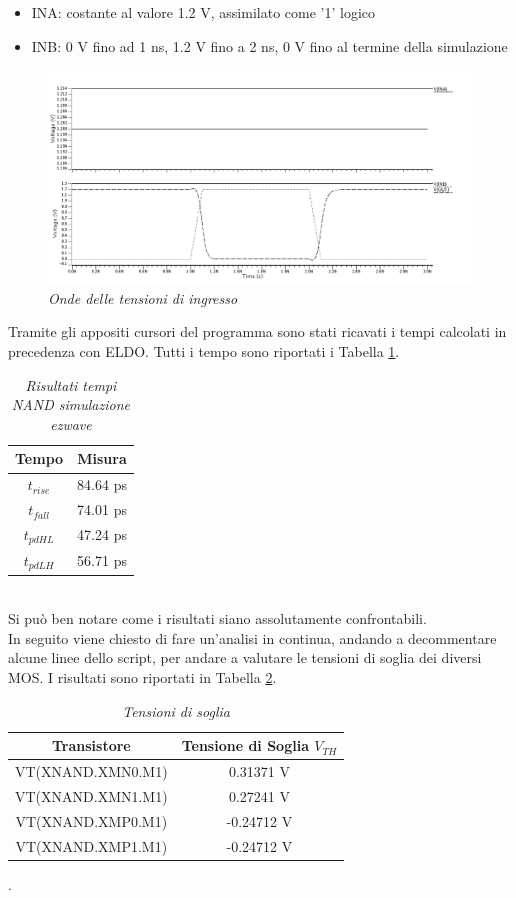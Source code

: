 \begin{itemize}
	\item INA: costante al valore 1.2 V, assimilato come '1' logico
	\item INB: 0 V fino ad 1 ns, 1.2 V fino a 2 ns, 0 V fino al termine della simulazione
\end{itemize}
\begin{figure}[!htb]
	\centering
	\includegraphics[scale=0.35]{immagini/onde_5_1}
	\caption{\textit{Onde delle tensioni di ingresso}}
	\label{onde_5_1}
\end{figure}
Tramite gli appositi cursori del programma sono stati ricavati i tempi calcolati in precedenza con ELDO. Tutti i tempo sono riportati i Tabella \ref{Tab5_2}. 
\begin{table}[!h]\footnotesize
	\centering
	\begin{tabular}{|c|c|}
		\hline
		\textbf{Tempo} & \textbf{Misura}\\
		\hline
		$t_{rise}$ & 84.64 ps\\
		$t_{fall}$ & 74.01 ps\\
		$t_{pdHL}$ & 47.24 ps\\
		$t_{pdLH}$ & 56.71 ps\\
		\hline
	\end{tabular}
	\caption{\textit{Risultati tempi NAND simulazione ezwave}}
	\label{Tab5_2}
\end{table}
\\
Si può ben notare come i risultati siano assolutamente confrontabili.\\
In seguito viene chiesto di fare un'analisi in continua, andando a decommentare alcune linee dello script, per andare a valutare le tensioni di soglia dei diversi MOS. I risultati sono riportati in Tabella \ref{Tab5_3}. 
\begin{table}[!h]\footnotesize
	\centering
	\begin{tabular}{|c|c|}
		\hline
		\textbf{Transistore} & \textbf{Tensione di Soglia $V_{TH}$}\\
		\hline
		VT(XNAND.XMN0.M1) & 0.31371 V\\
		VT(XNAND.XMN1.M1) & 0.27241 V\\
		VT(XNAND.XMP0.M1) & -0.24712 V\\
		VT(XNAND.XMP1.M1) & -0.24712 V\\
		\hline
	\end{tabular}
	\caption{\textit{Tensioni di soglia}}
	\label{Tab5_3}
\end{table}.
